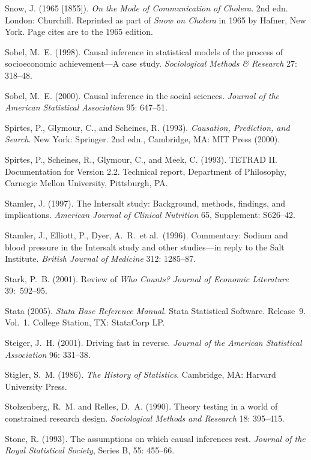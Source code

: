 \smallskip\noindent
Snow, J. (1965 [1855]).
{\it On the Mode of Communication of Cholera\/}. 2nd edn.
London: Churchill.
Reprinted as part of {\it Snow on Cholera\/} in 1965 by Hafner, New York.
Page cites are to the 1965 edition.

\smallskip\noindent
Sobel, M.~E. (1998).
Causal inference in statistical models of the process of socioeconomic achievement---A case study.
{\it Sociological Methods \& Research\/} 27: 318--48.

\smallskip\noindent
Sobel, M.~E. (2000).
Causal inference in the social sciences.
{\it Journal of the American Statistical Association\/} 95: 647--51.

\smallskip\noindent
Spirtes, P., Glymour, C., and Scheines, R. (1993).
{\it Causation, Prediction, and Search\/}.
New York: Springer. 2nd edn., Cambridge, MA: MIT Press (2000).

\smallskip\noindent
Spirtes, P., Scheines, R., Glymour, C., and Meek, C. (1993).
TETRAD II. Documentation for Version 2.2.
Technical report, Department of Philosophy, Carnegie Mellon University,
Pittsburgh, PA.

\smallskip\noindent
Stamler, J. (1997).
The Intersalt study: Background, methods, findings, and implications.
{\it American Journal of Clinical Nutrition\/} 65, Supplement: S626--42.

\smallskip\noindent
Stamler, J., Elliott, P., Dyer, A.~R.~et al.~(1996).
Commentary: Sodium and blood pressure in the Intersalt study and other studies---in reply to the Salt Institute.
{\it British Journal of Medicine\/} 312: 1285--87.

\smallskip\noindent
Stark, P.~B. (2001).
Review of {\it Who Counts?\/}
{\it Journal of Economic Literature\/} 39:~592--95.

\smallskip
\noindent
Stata (2005).
{\it Stata Base Reference Manual\/}.
Stata Statistical Software. Release~9. Vol.~1.
College Station, TX: StataCorp LP.

\smallskip\noindent
Steiger, J.~H. (2001).
Driving fast in reverse.
{\it Journal of the American Statistical Association\/} 96: 331--38.

\smallskip\noindent
Stigler, S.~M. (1986).
{\it The History of Statistics\/}.
Cambridge, MA: Harvard University Press.

\smallskip\noindent
Stolzenberg, R.~M. and Relles, D.~A. (1990).
Theory testing in a world of constrained research design.
{\it Sociological Methods and Research\/} 18: 395--415.

\smallskip\noindent
Stone, R. (1993).
The assumptions on which causal inferences rest.
{\it Journal of the Royal Statistical Society\/}, Series B, 55: 455--66.

